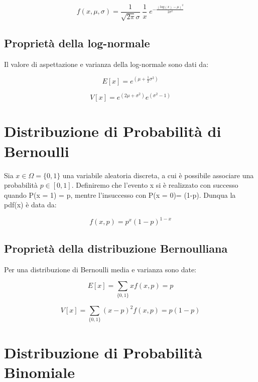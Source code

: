 \documentclass[11pt,a4paper]{book}
\begin{document}
\begin{equation*}
	f(x,\mu,\sigma) = \dfrac{1}{\sqrt{2\pi}\sigma}\;\dfrac{1}{x}\; e^{-\frac{(log(x)-\mu)^2}{2\sigma^2}}
\end{equation*} 

\subsection{Propriet\`{a} della log-normale}

Il valore di aspettazione e varianza della log-normale sono dati da:

\begin{equation}
	E[x] = e^{(\mu + \frac{1}{2}\sigma^2)}
\end{equation}

\begin{equation}
	V[x] = e^{(2\mu + \sigma^2)}e^{(\sigma^2-1)}
\end{equation}

\section{Distribuzione di Probabilit\`{a} di Bernoulli}

Sia $x \in \Omega = \{0,1\}$ una variabile aleatoria discreta, a cui \`{e} possibile associare una probabilit\`{a} $p \in [0,1]$. Definiremo che l'evento x si \`{e} realizzato con successo quando P(x = 1) = p, mentre l'insuccesso con P(x = 0)= (1-p). Dunqua la pdf(x) \`{e} data da:

\begin{equation*}
	f(x,p) = p^x(1-p)^{1-x}
\end{equation*}

\subsection{Propriet\`{a} della distribuzione Bernoulliana}

Per una distribuzione di Bernoulli media e varianza sono date:

\begin{equation}
	E[x] = \sum_{\{0,1\}}xf(x,p) = p
\end{equation}

\begin{equation}
	V[x] = \sum_{\{0,1\}}(x-p)^2f(x,p) = p(1-p)
\end{equation}

\section{Distribuzione di Probabilit\`{a} Binomiale}
\end{document}
